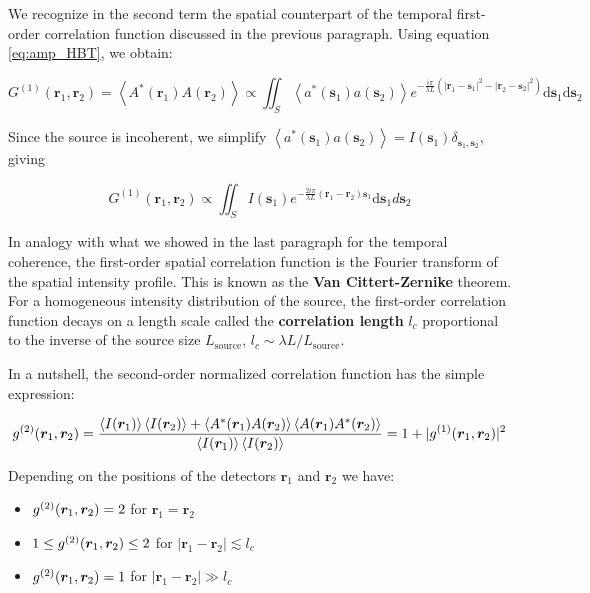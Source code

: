 \noindent We recognize in the second term the spatial counterpart of the temporal first-order correlation function discussed in the previous paragraph. Using equation \ref{eq:amp_HBT}, we obtain:

\begin{equation}
    G^{(1)}\left(\bm{r}_{1}, \bm{r}_{2}\right)=\left\langle A^*(\bm{r}_1) A(\bm{r}_2)\right\rangle \propto \iint_{S}\left\langle a^{*}(\bm{s}_1) a(\bm{s}_2)\right\rangle e^{-\frac{i \pi}{\lambda L}\left(\left|\bm{r}_{1}-\bm{s}_1\right|^{2}-\left|\bm{r}_{2}-\bm{s}_2\right|^{2}\right)} \mathrm{d} \bm{s}_1 \mathrm{d} \bm{s}_2
\end{equation}

\noindent Since the source is incoherent, we simplify $\left\langle a^{*}(\bm{s}_1) a(\bm{s}_2)\right\rangle = I(\bm{s}_1) \delta_{\bm{s}_1,\bm{s}_2}$, giving

\begin{equation}
    G^{(1)}\left(\bm{r}_{1}, \bm{r}_{2}\right) \propto \iint_{S} I(\bm{s}_1) e^{-\frac{2 i \pi}{\lambda L}\left(\bm{r}_{1}-\bm{r}_{2}\right) \bm{s}_1} \mathrm{d} \bm{s}_1 d \bm{s}_2
\end{equation}

\noindent In analogy with what we showed in the last paragraph for the temporal coherence, the first-order spatial correlation function is the Fourier transform of the spatial intensity profile. This is known as the \textbf{Van Cittert-Zernike} theorem. For a homogeneous intensity distribution of the source, the first-order correlation function decays on a length scale called the \textbf{correlation length} $l_c$ proportional to the inverse of the source size $L_{\mathrm{source}}$, $l_c \sim \lambda L / L_{\mathrm{source}}$.

In a nutshell, the second-order normalized correlation function has the simple expression:

\begin{equation}
    g^{(2)} (\bm{r}_1,\bm{r}_2) = \frac{\left\langle I(\bm{r}_1)\right\rangle \left\langle I(\bm{r}_2)\right\rangle + \left\langle A^*(\bm{r}_1) A(\bm{r}_2)\right\rangle \left\langle A(\bm{r}_1) A^*(\bm{r}_2)\right\rangle}{\left\langle I(\bm{r}_1)\right\rangle\left\langle I(\bm{r}_2)\right\rangle} = 1 + |g^{(1)}(\bm{r}_1,\bm{r}_2)|^2
\end{equation}

\noindent Depending on the positions of the detectors $\bm{r}_1$ and $\bm{r}_2$ we have:

\begin{itemize}
    \item $g^{(2)} (\bm{r}_1,\bm{r}_2)=2$ for $\bm{r}_1=\bm{r}_2$
    \item $1 \leq g^{(2)} (\bm{r}_1,\bm{r}_2) \leq 2$ for $|\bm{r}_1-\bm{r}_2| \lesssim l_{c}$
    \item $g^{(2)} (\bm{r}_1,\bm{r}_2)=1$ for $|\bm{r}_1-\bm{r}_2| \gg l_{c}$
\end{itemize}

